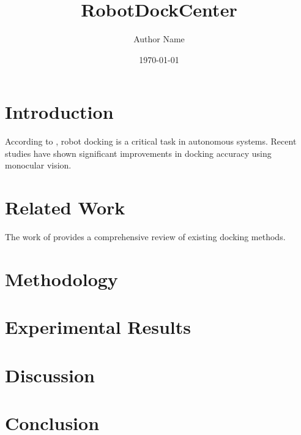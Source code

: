 \documentclass{article}
\begin{document}
\title{RobotDockCenter}
\author{Author Name}
\date{\today}

\maketitle

\begin{abstract}
\end{abstract}

\section{Introduction}
According to \citet{author2020}, robot docking is a critical task in autonomous systems. Recent studies \citep{author2019, author2021} have shown significant improvements in docking accuracy using monocular vision.

\section{Related Work}
The work of \citet{author2018} provides a comprehensive review of existing docking methods.

\section{Methodology}

\section{Experimental Results}

\section{Discussion}

\section{Conclusion}



\end{document}
